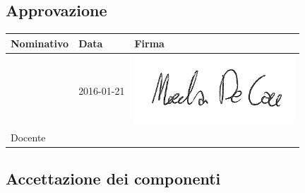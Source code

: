 \documentclass[12pt,a4paper]{article}
\begin{document}
\subsection{Approvazione}

\begin{table}[H]
	\begin{center}
		\begin{tabular}{l l l}
			\toprule
            \textbf{Nominativo}	& \textbf{Data} & \textbf{Firma} \\ \midrule
			\midrule
			\RE{} & 2016-01-21 & \includegraphics[width=6cm]{../img/firmaDeCao.png} \\ \midrule
			Docente &  & \\
		\end{tabular}
	\end{center}
\end{table}

\subsection{Accettazione dei componenti}
\end{document}

